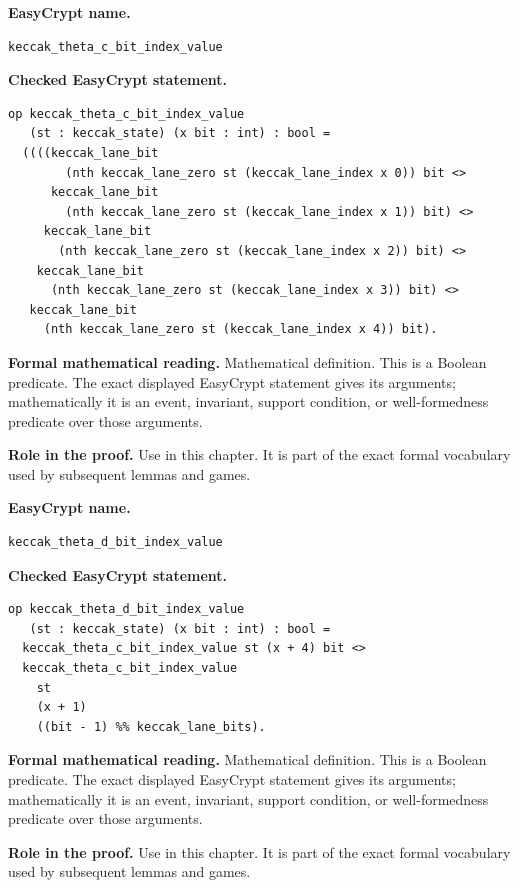 \begin{formaldefinition}
\noindent\textbf{EasyCrypt name.}
\begin{lstlisting}[language=EasyCrypt,basicstyle=\ttfamily\scriptsize]
keccak_theta_c_bit_index_value
\end{lstlisting}
\noindent\textbf{Checked EasyCrypt statement.}
\begin{lstlisting}[language=EasyCrypt,basicstyle=\ttfamily\scriptsize]
op keccak_theta_c_bit_index_value
   (st : keccak_state) (x bit : int) : bool =
  ((((keccak_lane_bit
        (nth keccak_lane_zero st (keccak_lane_index x 0)) bit <>
      keccak_lane_bit
        (nth keccak_lane_zero st (keccak_lane_index x 1)) bit) <>
     keccak_lane_bit
       (nth keccak_lane_zero st (keccak_lane_index x 2)) bit) <>
    keccak_lane_bit
      (nth keccak_lane_zero st (keccak_lane_index x 3)) bit) <>
   keccak_lane_bit
     (nth keccak_lane_zero st (keccak_lane_index x 4)) bit).
\end{lstlisting}
\noindent\textbf{Formal mathematical reading.}
Mathematical definition. This is a Boolean predicate.  The exact displayed EasyCrypt statement gives its arguments; mathematically it is an event, invariant, support condition, or well-formedness predicate over those arguments.

\noindent\textbf{Role in the proof.}
Use in this chapter. It is part of the exact formal vocabulary used by subsequent lemmas and games.

\end{formaldefinition}

\begin{formaldefinition}
\noindent\textbf{EasyCrypt name.}
\begin{lstlisting}[language=EasyCrypt,basicstyle=\ttfamily\scriptsize]
keccak_theta_d_bit_index_value
\end{lstlisting}
\noindent\textbf{Checked EasyCrypt statement.}
\begin{lstlisting}[language=EasyCrypt,basicstyle=\ttfamily\scriptsize]
op keccak_theta_d_bit_index_value
   (st : keccak_state) (x bit : int) : bool =
  keccak_theta_c_bit_index_value st (x + 4) bit <>
  keccak_theta_c_bit_index_value
    st
    (x + 1)
    ((bit - 1) %% keccak_lane_bits).
\end{lstlisting}
\noindent\textbf{Formal mathematical reading.}
Mathematical definition. This is a Boolean predicate.  The exact displayed EasyCrypt statement gives its arguments; mathematically it is an event, invariant, support condition, or well-formedness predicate over those arguments.

\noindent\textbf{Role in the proof.}
Use in this chapter. It is part of the exact formal vocabulary used by subsequent lemmas and games.

\end{formaldefinition}

